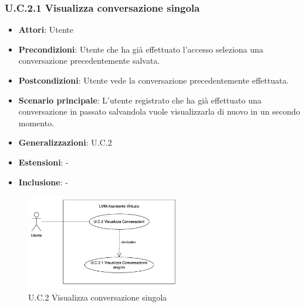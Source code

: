\subsubsection{U.C.2.1 Visualizza conversazione singola}
\begin{itemize}
    \item \textbf{Attori}: Utente
    \item \textbf{Precondizioni}: Utente che ha già effettuato l’accesso seleziona una conversazione precedentemente salvata.
    \item \textbf{Postcondizioni}: Utente vede la conversazione precedentemente effettuata.
    \item \textbf{Scenario principale}: L’utente registrato che ha già effettuato una conversazione in passato salvandola vuole visualizzarla di nuovo in un secondo momento.
    \item \textbf{Generalizzazioni}: U.C.2
    \item \textbf{Estensioni}: -
    \item \textbf{Inclusione}: -
\end{itemize}
\begin{figure}[H]
    \centering
    \includegraphics[width=0.6\textwidth]{img/UC2-1.png}
    \caption{U.C.2 Visualizza conversazione singola}
\end{figure}
